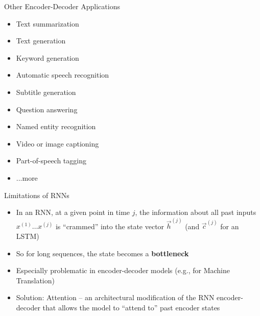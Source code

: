 
\begin{vbframe}{Other Encoder-Decoder Applications}

\vfill

\begin{itemize}
	\item Text summarization
	\item Text generation
	\item Keyword generation
	\item Automatic speech recognition
	\item Subtitle generation
	\item Question answering
	\item Named entity recognition
	\item Video or image captioning
	\item Part-of-speech tagging
	\item ...more
\end{itemize}

\vfill

\end{vbframe}


\begin{vbframe}{Limitations of RNNs}

\vfill

\begin{itemize}
	\item In an RNN, at a given point in time $j$, the information about all past inputs $x^{(1)} \ldots x^{(j)}$ is ``crammed'' into the state vector $\vec h^{(j)}$ (and $\vec c^{(j)}$ for an LSTM)
	\item So for long sequences, the state becomes a \textbf{bottleneck}
	\item Especially problematic in encoder-decoder models (e.g., for Machine Translation)
	\item Solution: Attention  -- an architectural modification of the RNN encoder-decoder that allows the model to ``attend to'' past encoder states
\end{itemize}

\vfill

\end{vbframe}


